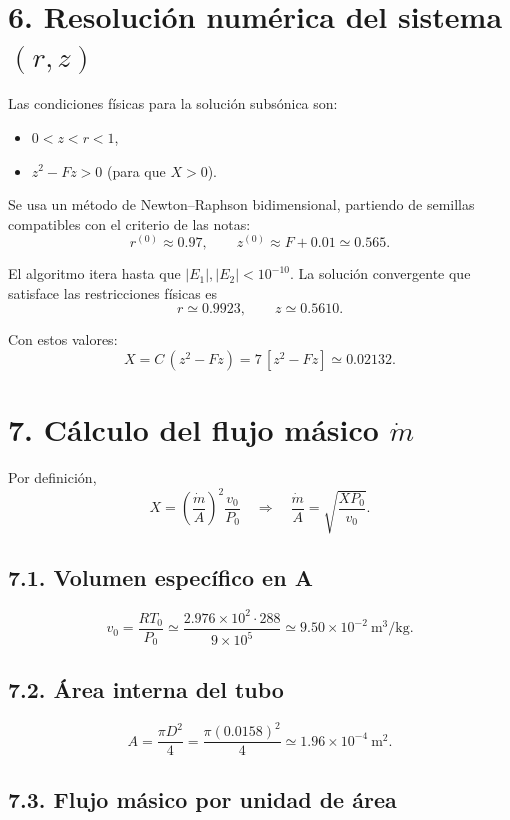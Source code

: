 \documentclass[11pt,a4paper]{article}
\begin{document}
\section*{6. Resolución numérica del sistema $(r,z)$}

Las condiciones físicas para la solución subsónica son:
\begin{itemize}
  \item $0<z<r<1$,
  \item $z^2 - F z > 0$ (para que $X>0$).
\end{itemize}

Se usa un método de Newton--Raphson bidimensional, partiendo de semillas compatibles con el criterio de las notas:
\[
r^{(0)}\approx 0.97, \qquad
z^{(0)}\approx F+0.01\simeq 0.565.
\]

El algoritmo itera hasta que $|E_1|,|E_2| < 10^{-10}$.
La solución convergente que satisface las restricciones físicas es
\[
\boxed{
r \simeq 0.9923,\qquad
z \simeq 0.5610.
}
\]

Con estos valores:
\[
X = C\,(z^2 - F z)
   = 7\,[z^2 - F z]
   \simeq 0.02132.
\]

\section*{7. Cálculo del flujo másico $\dot m$}

Por definición,
\[
X = \left(\frac{\dot m}{A}\right)^2 \frac{v_0}{P_0}
\quad\Rightarrow\quad
\frac{\dot m}{A} = \sqrt{\frac{X P_0}{v_0}}.
\]

\subsection*{7.1. Volumen específico en A}

\[
v_0 = \frac{R T_0}{P_0}
    \simeq \frac{2.976\times10^{2} \cdot 288}{9\times10^5}
    \simeq 9.50\times10^{-2}\ \text{m}^3/\text{kg}.
\]

\subsection*{7.2. Área interna del tubo}

\[
A = \frac{\pi D^2}{4}
  = \frac{\pi (0.0158)^2}{4}
  \simeq 1.96\times 10^{-4}\ \text{m}^2.
\]

\subsection*{7.3. Flujo másico por unidad de área}
\end{document}
